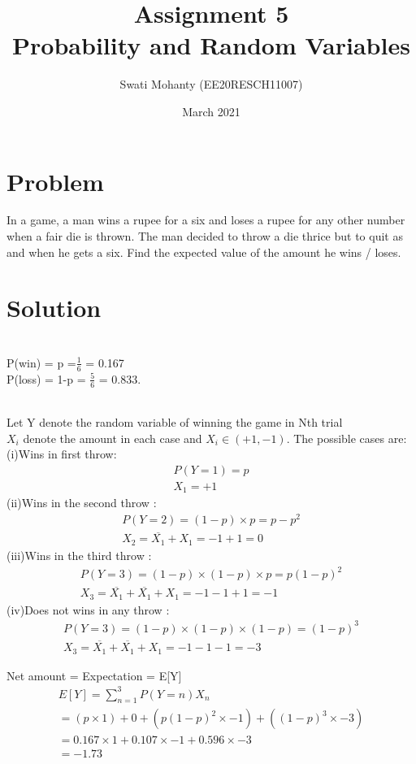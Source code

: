 \documentclass[journal,12pt,twocolumn]{IEEEtran}
\title{Assignment 5
\\Probability and Random Variables }
\author{Swati Mohanty (EE20RESCH11007) }
\date{March 2021}
\begin{document}
\maketitle


\section{Problem}
In a game, a man wins a rupee for a six and
loses a rupee for any other number when a
fair die is thrown. The man decided to throw
a die thrice but to quit as and when he gets a
six. Find the expected value of the amount he
wins / loses.

\section{Solution}
\\P(win) = p =$\frac{1}{6}$  = 0.167
\\ P(loss) = 1-p = $\frac{5}{6}$ = 0.833.
 
\\Let Y denote the random variable of winning the game in Nth trial
\\$X_i$ denote the amount in each case and $ X_i\in(+1,-1)$. The possible cases are:
\\(i)Wins in first throw:\begin{align}
    P(Y=1) = p 
    \\X_1 = +1
\end{align}
(ii)Wins in the second throw :\begin{align}
    P(Y=2) = (1-p)\times p = p-p^2
    \\X_2 = \overline{X_1} + X_1 = -1 +1 = 0
\end{align}
(iii)Wins in the third throw :\begin{align}
    P(Y=3) = (1-p)\times(1-p)\times p = p(1-p)^2
    \\X_3 = \overline{X_1} +\overline{X_1}+ X_1 = -1-1+1=-1
\end{align}
(iv)Does not wins in any throw :\begin{align}
    P(Y=3) = (1-p)\times(1-p)\times (1-p) = (1-p)^3
    \\X_3 = \overline{X_1} +\overline{X_1}+ X_1 = -1-1-1=-3
\end{align}

Net amount = Expectation = E[Y] 
\begin{align}
    E[Y] =  \sum_{n=1}^{3} P(Y=n)X_n
    \\= (p\times 1) +0 + (p(1-p)^2 \times -1) +((1-p)^3\times -3)
    \\=0.167\times1 +0.107\times-1 + 0.596\times-3
    \\=-1.73
\end{align}
\end{document}

